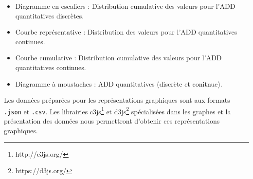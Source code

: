 \begin{enumerate}
\begin{itemize}
						\item Diagramme en escaliers : Distribution cumulative des valeurs pour l'ADD quantitatives discrètes.
						\item Courbe représentative : Distribution des valeurs pour l'ADD quantitatives continues.
						\item Courbe cumulative : Distribution cumulative des valeurs pour l'ADD quantitatives continues.
						\item Diagramme à moustaches : ADD quantitatives (discrète et conitnue).
					\end{itemize}
					Les données préparées pour les représentations graphiques sont aux formats \lstinline!.json! et \lstinline!.csv!. Les librairies c3js\footnote{http://c3js.org/} et d3js\footnote{https://d3js.org/} spécialisées dans les graphes et la présentation des données nous permettront d'obtenir ces représentations graphiques.
			\end{enumerate}
	
